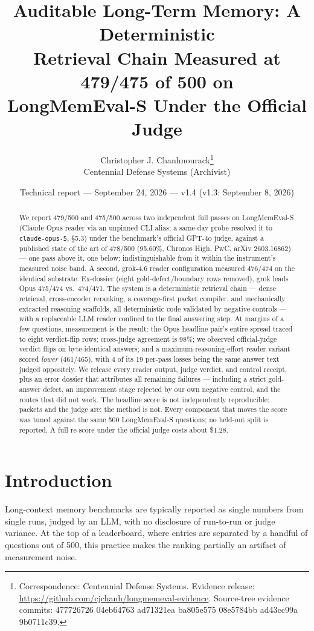 \documentclass[11pt]{article}
\title{\textbf{Auditable Long-Term Memory: A Deterministic\\Retrieval Chain Measured at 479/475 of 500 on\\LongMemEval-S Under the Official Judge}}
\author{Christopher J. Chanhnourack\thanks{Correspondence: Centennial Defense Systems. Evidence release: \url{https://github.com/cjchanh/longmemeval-evidence}. Source-tree evidence commits: 477726726 \textperiodcentered{} 04eb64763 \textperiodcentered{} ad71321ea \textperiodcentered{} ba805e575 \textperiodcentered{} 08e5784bb \textperiodcentered{} ad43cc99a \textperiodcentered{} 9b0711c39.}\\Centennial Defense Systems (Archivist)}
\date{Technical report --- September 24, 2026 --- v1.4 (v1.3: September 8, 2026)}
\begin{document}
\maketitle

\begin{abstract}
\noindent We report 479/500 and 475/500 across two independent full passes on
LongMemEval-S (Claude Opus reader via an unpinned CLI alias; a same-day probe resolved it to \texttt{claude-opus-5}, \S5.3) under the benchmark's official GPT-4o
judge, against a published state of the art of 478/500 (95.60\%,
Chronos High, PwC, arXiv 2603.16862) --- one pass above it, one below:
indistinguishable from it within the instrument's measured noise band.
A second, grok-4.6 reader configuration measured 476/474 on the identical
substrate. Ex-dossier (eight gold-defect/boundary rows removed), grok leads
Opus 475/474 vs.\ 474/471. The system is a deterministic retrieval chain --- dense retrieval,
cross-encoder reranking, a coverage-first packet compiler, and mechanically
extracted reasoning scaffolds, all deterministic code validated by negative
controls --- with a replaceable LLM reader confined to the final answering step.
At margins of a few questions, measurement is the result: the Opus headline pair's entire
spread traced to eight verdict-flip rows; cross-judge agreement is 98\%; we
observed official-judge verdict flips on byte-identical answers; and a
maximum-reasoning-effort reader variant scored \emph{lower} (461/465), with 4
of its 19 per-pass losses being the same answer text judged oppositely. We release
every reader output, judge verdict, and control receipt, plus an error dossier
that attributes all remaining failures --- including a strict gold-answer
defect, an improvement stage rejected by our own negative control, and the
routes that did not work. The headline score is not independently
reproducible: packets and the judge are; the method is not. Every
component that moves the score was tuned against the same 500
LongMemEval-S questions; no held-out split is reported. A full re-score
under the official judge costs about \$1.28.
\end{abstract}

\section{Introduction}
Long-context memory benchmarks are typically reported as single numbers from
single runs, judged by an LLM, with no disclosure of run-to-run or judge
variance. At the top of a leaderboard, where entries are separated by a handful
of questions out of 500, this practice makes the ranking partially an artifact
of measurement noise.
\end{document}
